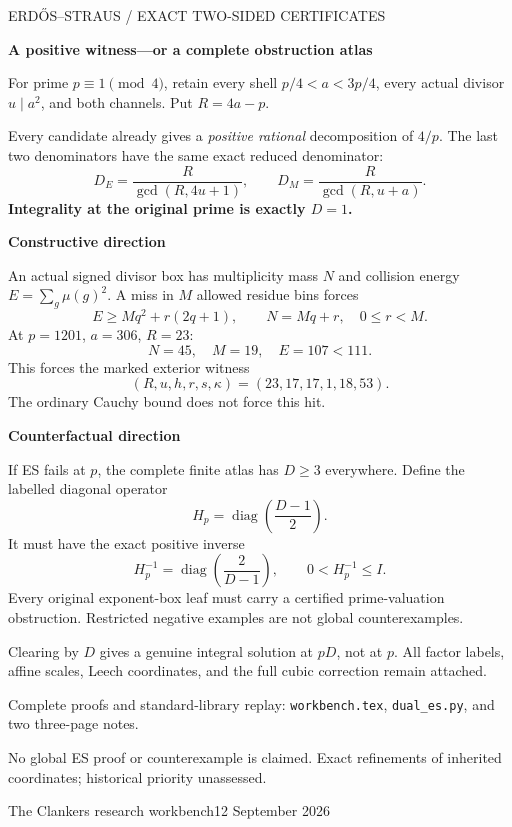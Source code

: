 \documentclass[11pt]{article}
\begin{document}
{\small\sffamily\color{ink} ERD\H{O}S--STRAUS \quad / \quad EXACT TWO-SIDED CERTIFICATES}

\vspace{5mm}
{\LARGE\bfseries A positive witness---or a complete obstruction atlas}

\vspace{3mm}
For prime $p\equiv1\pmod4$, retain every shell $p/4<a<3p/4$, every
actual divisor $u\mid a^2$, and both channels. Put $R=4a-p$.

Every candidate already gives a \emph{positive rational} decomposition of
$4/p$. The last two denominators have the same exact reduced denominator:
\[
\boxed{D_E=\frac{R}{\gcd(R,4u+1)},\qquad
       D_M=\frac{R}{\gcd(R,u+a)}.}
\]
{\large\bfseries Integrality at the original prime is exactly $D=1$.}

\vspace{3mm}{\color{rulegray}\hrule}\vspace{4mm}
{\large\bfseries Constructive direction}

An actual signed divisor box has multiplicity mass $N$ and collision energy
$E=\sum_g\mu(g)^2$. A miss in $M$ allowed residue bins forces
\[
E\ge Mq^2+r(2q+1),\qquad N=Mq+r,\quad0\le r<M.
\]
At $p=1201$, $a=306$, $R=23$:
\[
N=45,\quad M=19,\quad E=107<111.
\]
This forces the marked exterior witness
\[
(R,u,h,r,s,\kappa)=(23,17,17,1,18,53).
\]
The ordinary Cauchy bound does not force this hit.

\vspace{3mm}{\color{rulegray}\hrule}\vspace{4mm}
{\large\bfseries Counterfactual direction}

If ES fails at $p$, the complete finite atlas has $D\ge3$ everywhere.
Define the labelled diagonal operator
\[
H_p=\operatorname{diag}\!\left(\frac{D-1}{2}\right).
\]
It must have the exact positive inverse
\[
H_p^{-1}=\operatorname{diag}\!\left(\frac{2}{D-1}\right),
\qquad 0<H_p^{-1}\le I.
\]
Every original exponent-box leaf must carry a certified prime-valuation
obstruction. Restricted negative examples are not global counterexamples.

\vspace{3mm}{\color{rulegray}\hrule}\vspace{3mm}
{\small
Clearing by $D$ gives a genuine integral solution at $pD$, not at $p$.
All factor labels, affine scales, Leech coordinates, and the full cubic
correction remain attached.\par
Complete proofs and standard-library replay: \texttt{workbench.tex},
\texttt{dual\_es.py}, and two three-page notes.\par
No global ES proof or counterexample is claimed. Exact refinements of
inherited coordinates; historical priority unassessed.
}
\vfill
{\footnotesize\sffamily The Clankers research workbench\hfill 12 September 2026}
\end{document}
